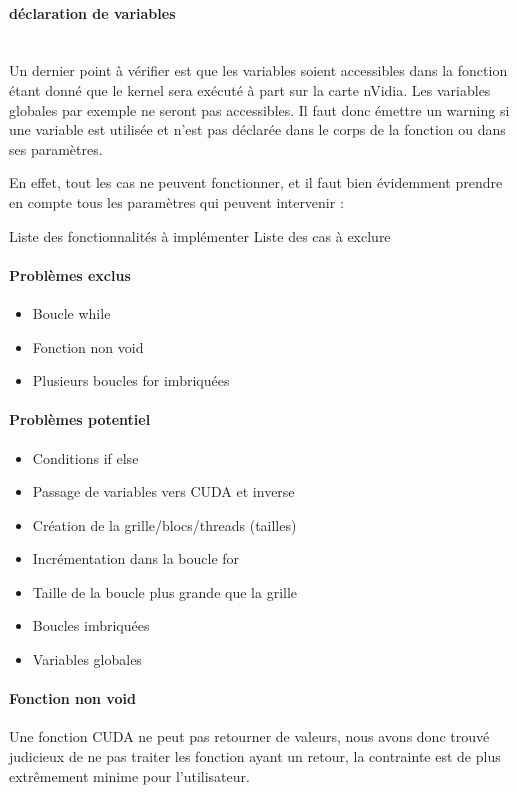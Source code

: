 \documentclass{article}
\begin{document}
	\paragraph{déclaration de variables}
	~~\\
	\indent
	Un dernier point à vérifier est que les variables soient accessibles dans la fonction étant donné que le kernel sera exécuté à part sur la carte nVidia. Les variables globales par exemple ne seront pas accessibles. Il faut donc émettre un warning si une variable est utilisée et n'est pas déclarée dans le corps de la fonction ou dans ses paramètres.
	
	En effet, tout les cas ne peuvent fonctionner, et il faut bien évidemment prendre en compte tous les paramètres qui peuvent intervenir :

	Liste des fonctionnalités à implémenter
	Liste des cas à exclure
	\paragraph{Problèmes exclus}
	\begin{itemize}
  		\item Boucle while
  		\item Fonction non void
  		\item Plusieurs boucles for imbriquées	
	\end{itemize}
	
	\paragraph{Problèmes potentiel}
		\begin{itemize}
  		\item Conditions if else
  		\item Passage de variables vers CUDA et inverse
  		\item Création de la grille/blocs/threads (tailles)
  		\item Incrémentation dans la boucle for
  		\item Taille de la boucle plus grande que la grille
  		\item Boucles imbriquées
  		\item Variables globales
	\end{itemize}
	\paragraph{Fonction non void}
	Une fonction CUDA ne peut pas retourner de valeurs, nous avons donc trouvé judicieux de ne pas traiter les fonction ayant un retour, la contrainte est de plus extrêmement minime pour l'utilisateur.
	
\end{document}
